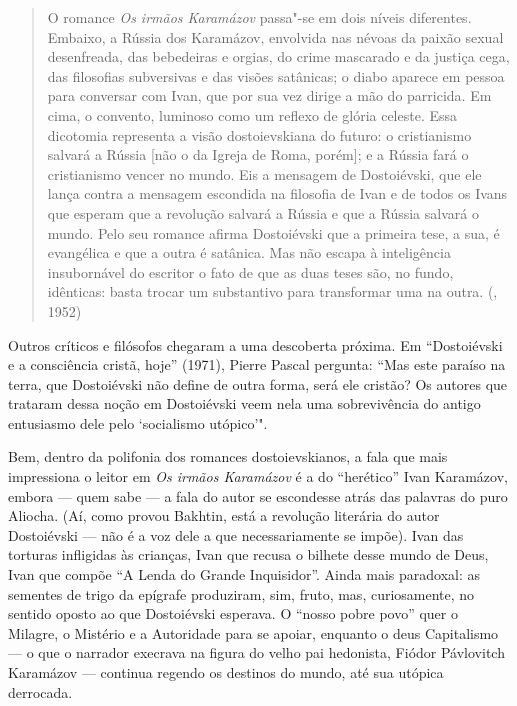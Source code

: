 \begin{quote}
O romance \emph{Os irmãos Karamázov} passa"-se em dois níveis diferentes. Embaixo, a Rússia dos Karamázov, envolvida nas névoas da paixão sexual desenfreada, das bebedeiras e orgias, do crime mascarado e da justiça cega, das filosofias subversivas e das visões satânicas; o diabo aparece em pessoa para conversar com Ivan, que por sua vez dirige a mão do parricida. Em cima, o convento, luminoso como um reflexo de glória celeste. Essa dicotomia representa a visão dostoievskiana do futuro: o cristianismo salvará a Rússia [não o da Igreja de Roma, porém]; e a Rússia fará o cristianismo vencer no mundo. Eis a mensagem de Dostoiévski, que ele lança contra a mensagem escondida na filosofia de Ivan e de todos os Ivans que esperam que a revolução salvará a Rússia e que a Rússia salvará o mundo. Pelo seu romance afirma Dostoiévski que a primeira tese, a sua, é evangélica e que a outra é satânica. Mas não escapa à inteligência insubornável do escritor o fato de que as duas teses são, no fundo, idênticas: basta trocar um substantivo para transformar uma na outra. (, 1952) 
\end{quote}

Outros críticos e filósofos chegaram a uma descoberta próxima. Em
``Dostoiévski e a consciência cristã, hoje'' (1971), Pierre Pascal
pergunta: ``Mas este paraíso na terra, que Dostoiévski não define
de outra forma, será ele cristão? Os autores que trataram dessa noção em
Dostoiévski veem nela uma sobrevivência do antigo entusiasmo dele pelo
`socialismo utópico'".

Bem, dentro da polifonia dos romances dostoievskianos, a fala que mais impressiona o leitor em \emph{Os irmãos Karamázov} é a do ``herético'' Ivan Karamázov, embora --- quem sabe --- a fala do autor se escondesse atrás das palavras do puro Aliocha. (Aí, como provou Bakhtin, está a revolução literária do autor Dostoiévski --- não é a voz dele a que necessariamente se impõe). Ivan das torturas infligidas às crianças, Ivan que recusa o bilhete desse mundo de Deus, Ivan que compõe ``A Lenda do Grande Inquisidor''. Ainda mais paradoxal: as sementes de trigo da epígrafe produziram, sim, fruto, mas, curiosamente, no sentido oposto ao
que Dostoiévski esperava. O ``nosso pobre povo'' quer o Milagre, o
Mistério e a Autoridade para se apoiar, enquanto o deus
Capitalismo --- o que o narrador execrava na figura do velho
pai hedonista, Fiódor Pávlovitch Karamázov --- continua regendo
os destinos do mundo, até sua utópica derrocada.

